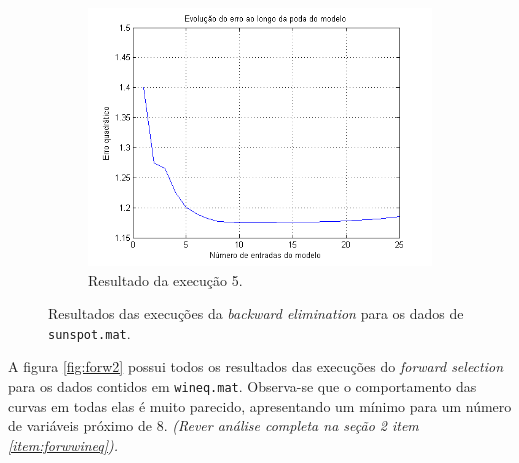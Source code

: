 \begin{figure}[H]
			\begin{subfigure}{.5\textwidth}
				  \centering
				  \includegraphics[width=1\linewidth]{image/backward5}
				  \caption{Resultado da execução 5.}
				  \label{backward5}
				\end{subfigure}	
			
			\caption{Resultados das execuções da \textit{backward elimination} para os
			dados de \texttt{sunspot.mat}.}
			\label{fig:back}
			\end{figure}


\FloatBarrier

\newpage

A figura \ref{fig:forw2} possui todos os resultados das
execuções do \textit{forward selection} para os dados contidos em
\texttt{wineq.mat}. Observa-se que o comportamento das curvas em todas elas é
muito parecido, apresentando um mínimo para um número de variáveis próximo de 8.
\textit{(Rever análise completa na seção 2 item \ref{item:forwwineq}).}

